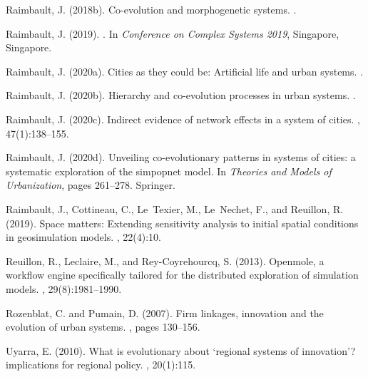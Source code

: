 \documentclass[letterpaper]{article}
\begin{document}
\begin{thebibliography}{}
Raimbault, J. (2018b).
\newblock Co-evolution and morphogenetic systems.
.

Raimbault, J. (2019).
.
\newblock In {\em {Conference on Complex Systems 2019}}, Singapore, Singapore.

Raimbault, J. (2020a).
\newblock Cities as they could be: Artificial life and urban systems.
.

Raimbault, J. (2020b).
\newblock Hierarchy and co-evolution processes in urban systems.
.

Raimbault, J. (2020c).
\newblock Indirect evidence of network effects in a system of cities.
,
  47(1):138--155.

Raimbault, J. (2020d).
\newblock Unveiling co-evolutionary patterns in systems of cities: a systematic
  exploration of the simpopnet model.
\newblock In {\em Theories and Models of Urbanization}, pages 261--278.
  Springer.

Raimbault, J., Cottineau, C., Le~Texier, M., Le~Nechet, F., and Reuillon, R.
  (2019).
\newblock Space matters: Extending sensitivity analysis to initial spatial
  conditions in geosimulation models.
,
  22(4):10.

Reuillon, R., Leclaire, M., and Rey-Coyrehourcq, S. (2013).
\newblock Openmole, a workflow engine specifically tailored for the distributed
  exploration of simulation models.
, 29(8):1981--1990.

Rozenblat, C. and Pumain, D. (2007).
\newblock Firm linkages, innovation and the evolution of urban systems.
, pages
  130--156.

Uyarra, E. (2010).
\newblock What is evolutionary about ‘regional systems of innovation’?
  implications for regional policy.
, 20(1):115.


\end{thebibliography}
\end{document}
